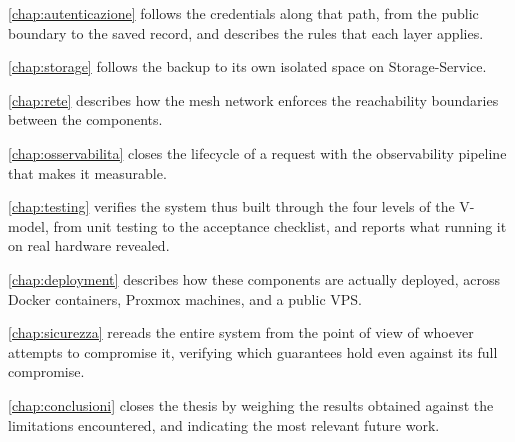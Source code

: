 \autoref{chap:autenticazione} follows the credentials along that path, from the public boundary to the
saved record, and describes the rules that each layer applies.

\autoref{chap:storage} follows the backup to its own isolated space on Storage-Service.

\autoref{chap:rete} describes how the mesh network enforces the reachability boundaries between the
components.

\autoref{chap:osservabilita} closes the lifecycle of a request with the
observability pipeline that makes it measurable.

\autoref{chap:testing} verifies the system thus built through the four levels of the
V-model, from unit testing to the acceptance checklist, and reports what running it on real hardware revealed.

\autoref{chap:deployment} describes how these components are actually deployed, across
Docker containers, Proxmox machines, and a public VPS.

\autoref{chap:sicurezza} rereads the entire system from the point of view of whoever attempts to compromise it,
verifying which guarantees hold even against its full compromise.

\autoref{chap:conclusioni} closes the thesis by weighing the results obtained against the limitations encountered,
and indicating the most relevant future work.
